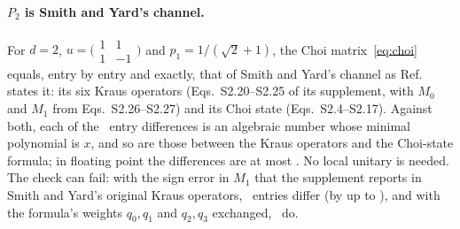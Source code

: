 \documentclass[aps,pra,twocolumn,superscriptaddress,nofootinbib,longbibliography,floatfix]{revtex4-2}
\begin{document}
\paragraph*{$P_2$ is Smith and Yard's channel.} For $d=2$, $u=\bigl(\begin{smallmatrix}1&1\\1&-1\end{smallmatrix}\bigr)$ and $p_1=1/(\sqrt2+1)$, the Choi matrix~\eqref{eq:choi} equals, entry by entry and exactly, that of Smith and Yard's channel as Ref.~\cite{parentin2026onset} states it: its six Kraus operators (Eqs.~S2.20--S2.25 of its supplement, with $M_0$ and $M_1$ from Eqs.~S2.26--S2.27) and its Choi state (Eqs.~S2.4--S2.17). Against both, each of the \KrausEntries\ entry differences is an algebraic number whose minimal polynomial is $x$, and so are those between the Kraus operators and the Choi-state formula; in floating point the differences are at most \KrausDiff. No local unitary is needed. The check can fail: with the sign error in $M_1$ that the supplement reports in Smith and Yard's original Kraus operators, \KrausTypoUnequal\ entries differ (by up to \KrausTypoDiff), and with the formula's weights $q_0,q_1$ and $q_2,q_3$ exchanged, \KrausSwapUnequal\ do.
\end{document}
